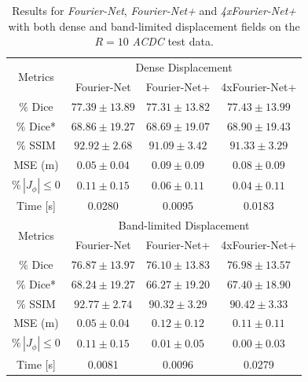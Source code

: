 \documentclass[english,version-2022-01]{uzl-thesis} %
\begin{document}
\begin{table}[H] %
	\centering
	\caption{Results for \emph{Fourier-Net}, \emph{Fourier-Net+} and \emph{4xFourier-Net+} with both dense and band-limited displacement fields on the $R=10$ \emph{ACDC} test data.}
	\label{tab:DenseDisplacementAcc10}
	\begin{tabular}{c c c c} %
		\toprule
		\multirow{2}{*}{Metrics} & \multicolumn{3}{c}{Dense Displacement} \\
		\cline{2-4} 
		 & Fourier-Net & Fourier-Net+ & 4xFourier-Net+\\	
		\midrule
		$\%$ Dice & $77.39 \pm 13.89$ & $77.31 \pm 13.82$ & $77.43 \pm 13.99$\\
		$\%$ Dice* & $68.86 \pm 19.27$ & $68.69 \pm 19.07$ & $68.90 \pm 19.43$ \\
		$\%$ SSIM & $92.92 \pm 2.68$ & $91.09 \pm 3.42$ & $91.33 \pm 3.29$\\
		MSE (m) & $0.05 \pm 0.04$ & $0.09 \pm 0.09$ & $0.08 \pm 0.09$ \\
		$\% \, |J_{\phi}|\leq0$ & $0.11 \pm 0.15$ & $0.06 \pm 0.11$ & $0.04 \pm 0.11$ \\
		Time [s] 	  & 0.0280 & 0.0095 & 0.0183  \\
		\midrule
		\multirow{2}{*}{Metrics} & \multicolumn{3}{c}{Band-limited Displacement} \\
		\cline{2-4} 
		 & Fourier-Net & Fourier-Net+ & 4xFourier-Net+\\		
		\midrule
		$\%$ Dice & $76.87 \pm 13.97$ & $76.10 \pm 13.83$ & $76.98 \pm 13.57$\\
		$\%$ Dice* & $68.24 \pm 19.27$ & $66.27 \pm 19.20$ & $67.40 \pm 18.90$ \\
		$\%$ SSIM & $92.77 \pm 2.74$ & $90.32 \pm 3.29$ & $90.42 \pm 3.33$\\
		MSE (m) & $0.05 \pm 0.04$ & $0.12 \pm 0.12$ & $0.11 \pm 0.11$ \\
		$\% \, |J_{\phi}|\leq0$ & $0.11 \pm 0.15$ & $0.01 \pm 0.05$ & $0.00 \pm 0.03$ \\
		Time [s] 	  & 0.0081 & 0.0096 & 0.0279  \\
		\bottomrule
	\end{tabular}	
\end{table}
 
\newpage
\end{document}
